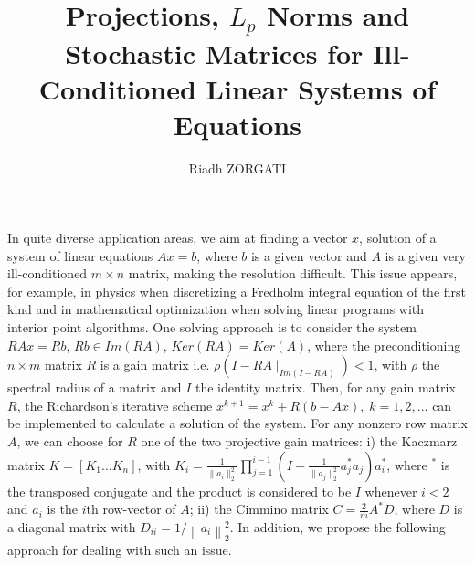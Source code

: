 \documentclass[a4paper]{amsart}
\date{}
\begin{document}
\title{Projections, $L_p$ Norms and Stochastic Matrices for Ill-Conditioned Linear Systems of Equations}
\author{Riadh ZORGATI} %
\address{EDF Lab Paris Saclay} %

\maketitle


In quite diverse application areas, we aim at finding a vector $x$, solution of a system of linear equations $Ax=b$, where $b$ is a given vector and $A$ is a given very ill-conditioned $m \times n$ matrix, making the resolution difficult. This issue appears, for example, in physics when discretizing a Fredholm integral equation of the first kind and in mathematical optimization when solving linear programs with interior point algorithms. One solving approach is to consider the system $RAx = Rb$, $Rb \in Im(RA)$, $Ker(RA)=Ker(A)$, where the preconditioning $n \times m$ matrix $R$ is a gain matrix i.e. $\rho(I-RA\mid_{Im(I-RA)}) < 1$, with $\rho$ the spectral radius of a matrix and $I$ the identity matrix. Then, for any gain matrix $R$, the Richardson's iterative scheme $x^{k+1}=x^{k}+R(b-Ax), \; k=1, 2, ... $ can be implemented to calculate a solution of the system. For any nonzero row matrix $A$, we can choose for $R$ one of the two projective gain matrices: i) the Kaczmarz matrix $K = [K_1 ... K_n]$, with $K_i = \frac{1}{\|a_i\|^2_2}\prod_{j=1}^{i-1} (I -\frac{1}{\|a_j\|^2_2}a_j^*a_j)a_i^*$, where $^{*}$ is the transposed conjugate and the product is considered to be $I$ whenever $i<2$ and $a_i$ is the $i$th row-vector of $A$; ii) the Cimmino matrix $C = \frac{2}{m}A^\ast D$, where $D$ is a diagonal matrix with $D_{ii}=1/\left\| {a_i} \right\|_2^{2}$. In addition, we propose the following approach for dealing with such an issue. ~\\
\end{document}
